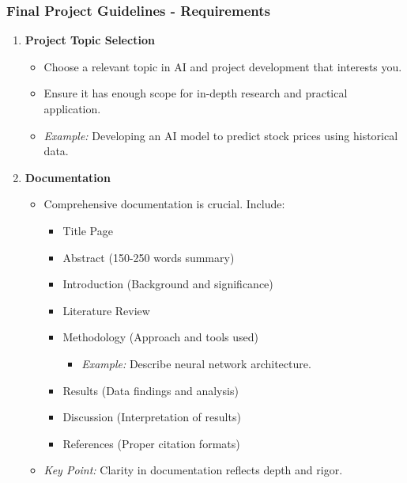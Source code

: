 \documentclass[aspectratio=169]{beamer}
\begin{document}
\begin{frame}[fragile]
    \frametitle{Final Project Guidelines - Requirements}
    \begin{enumerate}
        \item \textbf{Project Topic Selection}
            \begin{itemize}
                \item Choose a relevant topic in AI and project development that interests you.
                \item Ensure it has enough scope for in-depth research and practical application.
                \item \textit{Example:} Developing an AI model to predict stock prices using historical data.
            \end{itemize}

        \item \textbf{Documentation}
            \begin{itemize}
                \item Comprehensive documentation is crucial. Include:
                    \begin{itemize}
                        \item Title Page
                        \item Abstract (150-250 words summary)
                        \item Introduction (Background and significance)
                        \item Literature Review
                        \item Methodology (Approach and tools used)
                            \begin{itemize}
                                \item \textit{Example:} Describe neural network architecture.
                            \end{itemize}
                        \item Results (Data findings and analysis)
                        \item Discussion (Interpretation of results)
                        \item References (Proper citation formats)
                    \end{itemize}
                \item \textit{Key Point:} Clarity in documentation reflects depth and rigor.
            \end{itemize}
    \end{enumerate}
\end{frame}
\end{document}
